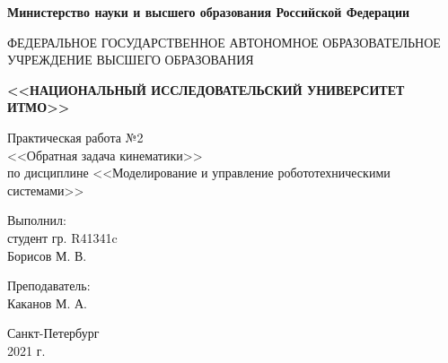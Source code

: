 \begin{titlepage}
    \begin{center}
        \begin{small}
            \textbf{Министерство науки и высшего образования Российской Федерации}

            \vspace{1em}

            ФЕДЕРАЛЬНОЕ ГОСУДАРСТВЕННОЕ АВТОНОМНОЕ ОБРАЗОВАТЕЛЬНОЕ\\
            УЧРЕЖДЕНИЕ ВЫСШЕГО ОБРАЗОВАНИЯ

            \vspace{1em}

            \textbf{<<НАЦИОНАЛЬНЫЙ ИССЛЕДОВАТЕЛЬСКИЙ УНИВЕРСИТЕТ ИТМО>>}
        \end{small}

        \vspace{13ex}

        Практическая работа №2\\
        <<Обратная задача кинематики>>\\
        по дисциплине <<Моделирование и управление робототехническими системами>>
    \end{center}

    \vspace{14em}

    \begin{flushright}
        \noindent
        Выполнил:\\
        студент гр. R41341c\\
        Борисов М. В.

        \vspace{1em}
        Преподаватель:\\
        Каканов М. А.
    \end{flushright}

    \vfill

    \begin{center}
        \large{Санкт-Петербург}\\
        2021 г.\\
    \end{center}
\end{titlepage}
